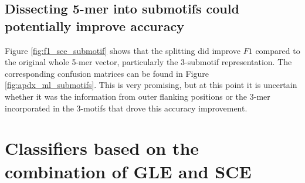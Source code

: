 

\subsection{Dissecting 5-mer into submotifs could potentially improve accuracy}

Figure \ref{fig:f1_sce_submotif} shows that the splitting did improve $F1$ compared to the original whole 5-mer vector, particularly the 3-submotif representation. The corresponding confusion matrices can be found in Figure \ref{fig:apdx_ml_submotifs}. This is very promising, but at this point it is uncertain whether it was the information from outer flanking positions or the 3-mer incorporated in the 3-motifs that drove this accuracy improvement.



\section{Classifiers based on the combination of GLE and SCE}\label{ml:both}

